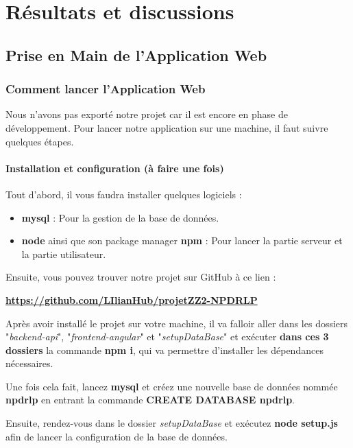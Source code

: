 \documentclass[12pt,french]{article}
\begin{document}
\section{Résultats et discussions}

\subsection{Prise en Main de l'Application Web}

\subsubsection{Comment lancer l'Application Web}

Nous n'avons pas exporté notre projet car il est encore en phase de développement. Pour lancer notre application sur une machine, il faut suivre quelques étapes.

\paragraph{Installation et configuration (à faire une fois)}

Tout d'abord, il vous faudra installer quelques logiciels :

\begin{itemize}
	\item \textbf{mysql} : Pour la gestion de la base de données.
	\item \textbf{node} ainsi que son package manager \textbf{npm} : Pour lancer la partie serveur et la partie utilisateur.
\end{itemize}

Ensuite, vous pouvez trouver notre projet sur GitHub à ce lien :

\textbf{\href{https://github.com/LIlianHub/projetZZ2-NPDRLP}{https://github.com/LIlianHub/projetZZ2-NPDRLP}}

Après avoir installé le projet sur votre machine, il va falloir aller dans les dossiers "\textit{backend-api}", "\textit{frontend-angular}" et "\textit{setupDataBase}" et exécuter \textbf{dans ces 3 dossiers} la commande \textbf{npm i}, qui va permettre d'installer les dépendances nécessaires.

Une fois cela fait, lancez \textbf{mysql} et créez une nouvelle base de données nommée \textbf{npdrlp} en entrant la commande \textbf{CREATE DATABASE npdrlp}.

Ensuite, rendez-vous dans le dossier \textit{setupDataBase} et exécutez \textbf{node setup.js} afin de lancer la configuration de la base de données.
\end{document}

